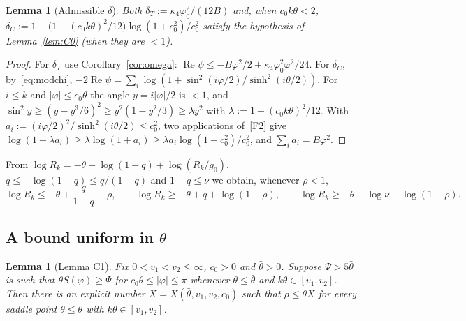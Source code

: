 \documentclass[11pt]{amsart}
\newtheorem{lemma}[theorem]{Lemma}
\theoremstyle{definition}
\theoremstyle{remark}
\numberwithin{equation}{section}
\newcommand{\re}{\operatorname{Re}}
\begin{document}
\begin{lemma}[Admissible $\delta$]\label{lem:delta}
Both $\delta_T:=\kappa_4\varphi_0^2/(12B)$ and, when $c_0k\theta<2$,
$\delta_C:=1-\bigl(1-(c_0k\theta)^2/12\bigr)\log(1+c_0^2)/c_0^2$ satisfy the hypothesis of Lemma~\ref{lem:C0} (when they are $<1$).
\end{lemma}

\begin{proof}
For $\delta_T$ use Corollary~\ref{cor:omega}: $\re\psi\le-B\varphi^2/2+\kappa_4\varphi_0^2\varphi^2/24$. For $\delta_C$, by~\eqref{eq:modchi},
$-2\re\psi=\sum_i\log(1+\sin^2(i\varphi/2)/\sinh^2(i\theta/2))$. For $i\le k$ and $|\varphi|\le c_0\theta$ the angle $y=i|\varphi|/2$ is
$<1$, and $\sin^2y\ge(y-y^3/6)^2\ge y^2(1-y^2/3)\ge\lambda y^2$ with $\lambda:=1-(c_0k\theta)^2/12$. With
$a_i:=(i\varphi/2)^2/\sinh^2(i\theta/2)\le c_0^2$, two applications of~\ref{F2} give
$\log(1+\lambda a_i)\ge\lambda\log(1+a_i)\ge\lambda a_i\log(1+c_0^2)/c_0^2$, and $\sum_ia_i=B\varphi^2$.
\end{proof}

From $\log R_k=-\theta-\log(1-q)+\log(R_k/g_0)$, $q\le-\log(1-q)\le q/(1-q)$ and $1-q\le\nu$ we obtain, whenever $\rho<1$,
\begin{equation}\label{eq:C0cons}
  \log R_k\le-\theta+\frac q{1-q}+\rho,\qquad \log R_k\ge-\theta+q+\log(1-\rho),\qquad \log R_k\ge-\theta-\log\nu+\log(1-\rho).
\end{equation}

\subsection{A bound uniform in \texorpdfstring{$\theta$}{theta}}
\begin{lemma}[Lemma C1]\label{lem:C1}
Fix $0<v_1<v_2\le\infty$, $c_0>0$ and $\bar\theta>0$. Suppose $\Psi>5\bar\theta$ is such that $\theta S(\varphi)\ge\Psi$ for
$c_0\theta\le|\varphi|\le\pi$ whenever $\theta\le\bar\theta$ and $k\theta\in[v_1,v_2]$. Then there is an explicit number
$X=X(\bar\theta,v_1,v_2,c_0)$ such that $\rho\le\theta X$ for every saddle point $\theta\le\bar\theta$ with $k\theta\in[v_1,v_2]$.
\end{lemma}
\end{document}
